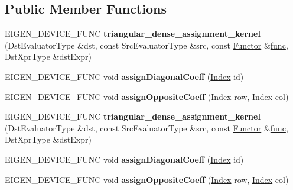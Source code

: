 \subsection*{Public Member Functions}
\begin{DoxyCompactItemize}
\item 
\mbox{\label{class_eigen_1_1internal_1_1triangular__dense__assignment__kernel_aa2a9bd0214adb7f1bb43ea6fc81c2f18}} 
E\+I\+G\+E\+N\+\_\+\+D\+E\+V\+I\+C\+E\+\_\+\+F\+U\+NC {\bfseries triangular\+\_\+dense\+\_\+assignment\+\_\+kernel} (Dst\+Evaluator\+Type \&dst, const Src\+Evaluator\+Type \&src, const \hyperlink{struct_functor}{Functor} \&\hyperlink{structfunc}{func}, Dst\+Xpr\+Type \&dst\+Expr)
\item 
\mbox{\label{class_eigen_1_1internal_1_1triangular__dense__assignment__kernel_a5df49eb21fc70622e8c1180f1993b26d}} 
E\+I\+G\+E\+N\+\_\+\+D\+E\+V\+I\+C\+E\+\_\+\+F\+U\+NC void {\bfseries assign\+Diagonal\+Coeff} (\hyperlink{namespace_eigen_a62e77e0933482dafde8fe197d9a2cfde}{Index} id)
\item 
\mbox{\label{class_eigen_1_1internal_1_1triangular__dense__assignment__kernel_a54a1a283bd1d1008a766540888832876}} 
E\+I\+G\+E\+N\+\_\+\+D\+E\+V\+I\+C\+E\+\_\+\+F\+U\+NC void {\bfseries assign\+Opposite\+Coeff} (\hyperlink{namespace_eigen_a62e77e0933482dafde8fe197d9a2cfde}{Index} row, \hyperlink{namespace_eigen_a62e77e0933482dafde8fe197d9a2cfde}{Index} col)
\item 
\mbox{\label{class_eigen_1_1internal_1_1triangular__dense__assignment__kernel_aa2a9bd0214adb7f1bb43ea6fc81c2f18}} 
E\+I\+G\+E\+N\+\_\+\+D\+E\+V\+I\+C\+E\+\_\+\+F\+U\+NC {\bfseries triangular\+\_\+dense\+\_\+assignment\+\_\+kernel} (Dst\+Evaluator\+Type \&dst, const Src\+Evaluator\+Type \&src, const \hyperlink{struct_functor}{Functor} \&\hyperlink{structfunc}{func}, Dst\+Xpr\+Type \&dst\+Expr)
\item 
\mbox{\label{class_eigen_1_1internal_1_1triangular__dense__assignment__kernel_a5df49eb21fc70622e8c1180f1993b26d}} 
E\+I\+G\+E\+N\+\_\+\+D\+E\+V\+I\+C\+E\+\_\+\+F\+U\+NC void {\bfseries assign\+Diagonal\+Coeff} (\hyperlink{namespace_eigen_a62e77e0933482dafde8fe197d9a2cfde}{Index} id)
\item 
\mbox{\label{class_eigen_1_1internal_1_1triangular__dense__assignment__kernel_a54a1a283bd1d1008a766540888832876}} 
E\+I\+G\+E\+N\+\_\+\+D\+E\+V\+I\+C\+E\+\_\+\+F\+U\+NC void {\bfseries assign\+Opposite\+Coeff} (\hyperlink{namespace_eigen_a62e77e0933482dafde8fe197d9a2cfde}{Index} row, \hyperlink{namespace_eigen_a62e77e0933482dafde8fe197d9a2cfde}{Index} col)
\end{DoxyCompactItemize}
